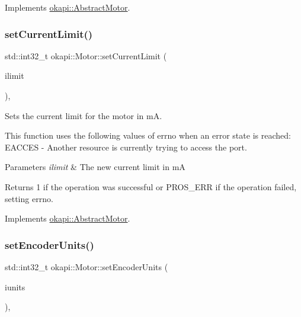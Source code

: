 Implements \mbox{\hyperlink{classokapi_1_1AbstractMotor_af7bb7d0d895c89d6b193f500587a818b}{okapi\+::\+Abstract\+Motor}}.

\mbox{\label{classokapi_1_1Motor_ab54e856d8d55c1f53e1be113a9e90a00}} 
\subsubsection{\texorpdfstring{setCurrentLimit()}{setCurrentLimit()}}
{\footnotesize\ttfamily std\+::int32\+\_\+t okapi\+::\+Motor\+::set\+Current\+Limit (\begin{DoxyParamCaption}\item[{std\+::int32\+\_\+t}]{ilimit }\end{DoxyParamCaption})\hspace{0.3cm}{\ttfamily [override]}, {\ttfamily [virtual]}}

Sets the current limit for the motor in mA.

This function uses the following values of errno when an error state is reached\+: E\+A\+C\+C\+ES -\/ Another resource is currently trying to access the port.


\begin{DoxyParams}{Parameters}
{\em ilimit} & The new current limit in mA \\
\hline
\end{DoxyParams}
\begin{DoxyReturn}{Returns}
1 if the operation was successful or P\+R\+O\+S\+\_\+\+E\+RR if the operation failed, setting errno. 
\end{DoxyReturn}


Implements \mbox{\hyperlink{classokapi_1_1AbstractMotor_aec97c81f3d6604363ebc8ceaf425fe39}{okapi\+::\+Abstract\+Motor}}.

\mbox{\label{classokapi_1_1Motor_a96466636470045aa63d81cb0effc9486}} 
\subsubsection{\texorpdfstring{setEncoderUnits()}{setEncoderUnits()}}
{\footnotesize\ttfamily std\+::int32\+\_\+t okapi\+::\+Motor\+::set\+Encoder\+Units (\begin{DoxyParamCaption}\item[{\mbox{\hyperlink{classokapi_1_1AbstractMotor_ae811cd825099f2defadeb1b7f7e7764c}{Abstract\+Motor\+::encoder\+Units}}}]{iunits }\end{DoxyParamCaption})\hspace{0.3cm}{\ttfamily [override]}, {\ttfamily [virtual]}}


